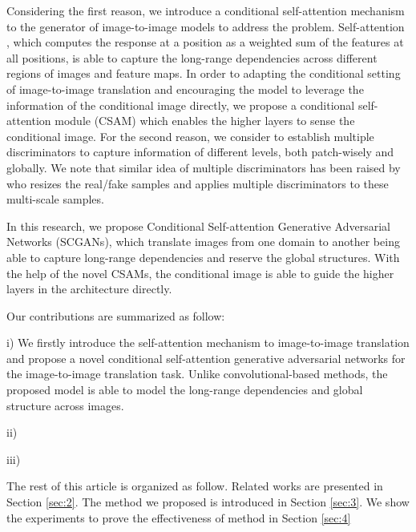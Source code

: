 Considering the first reason, we introduce a conditional self-attention mechanism to the generator of image-to-image models to address the problem.
Self-attention \cite{Non-local, Attention, MachineReading, SAGAN}, which computes the response at a position as a weighted sum of the features at all positions, is able to capture the long-range dependencies across different regions of images and feature maps. In order to adapting the conditional setting of image-to-image translation and encouraging the model to leverage the information of the conditional image directly, we propose a conditional self-attention module (CSAM) which enables the higher layers to sense the conditional image. 
%
For the second reason, we consider to establish multiple discriminators to capture information of different levels, both patch-wisely and globally. We note that similar idea of multiple discriminators has been raised by \cite{Multi-D} who resizes the real/fake samples and applies multiple discriminators to these multi-scale samples. 

In this research, we propose Conditional Self-attention Generative Adversarial Networks (SCGANs), which translate images from one domain to another being able to capture long-range dependencies and reserve the global structures. With the help of the novel CSAMs, the conditional image is able to guide the higher layers in the architecture directly.  

Our contributions are summarized as follow:

i) We firstly introduce the self-attention mechanism to image-to-image translation and propose a novel conditional self-attention generative adversarial networks for the image-to-image translation task. Unlike convolutional-based methods, the proposed model is able to model the long-range dependencies and global structure across images.

ii)

iii)

The rest of this article is organized as follow. Related works are presented in Section \ref{sec:2}. The method we proposed is introduced in Section \ref{sec:3}. We show the experiments to prove the effectiveness of method in Section \ref{sec:4}